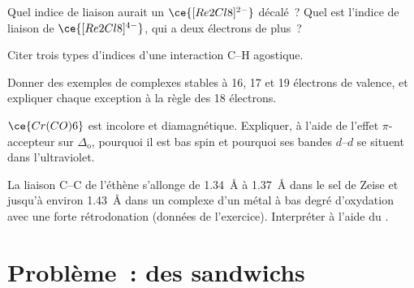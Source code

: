 \begin{exercise}[$\star\star$]\label{exo:b3:organometallic-bonding:8}
Quel indice de liaison aurait un $\ce{[Re2Cl8]^{2-}}$ décalé~? Quel est l'indice de liaison de
$\ce{[Re2Cl8]^{4-}}$, qui a deux électrons de plus~?
\end{exercise}

\begin{exercise}[$\star\star$]\label{exo:b3:organometallic-bonding:9}
Citer trois types d'indices d'une interaction C--H agostique.
\end{exercise}

\begin{exercise}[$\star\star\star$]\label{exo:b3:organometallic-bonding:10}
Donner des exemples de complexes stables à 16, 17 et 19 électrons de
valence, et expliquer chaque exception à la règle des 18 électrons.
\end{exercise}

\begin{exercise}[$\star\star\star$]\label{exo:b3:organometallic-bonding:11}
$\ce{Cr(CO)6}$ est incolore et diamagnétique. Expliquer, à l'aide de l'effet $\pi$-accepteur sur $\Delta_{\mathrm o}$,
pourquoi il est bas spin et pourquoi ses bandes $d$--$d$ se situent dans l'ultraviolet.
\end{exercise}

\begin{exercise}[$\star\star\star$]\label{exo:b3:organometallic-bonding:12}
La liaison C--C de l'éthène s'allonge de \qty{1.34}{\angstrom} à
\qty{1.37}{\angstrom} dans le sel de Zeise et jusqu'à environ
\qty{1.43}{\angstrom} dans un complexe d'un métal à bas degré d'oxydation
avec une forte rétrodonation (données de l'exercice). Interpréter à l'aide
du .
\end{exercise}

\section{Problème~: des sandwichs}

